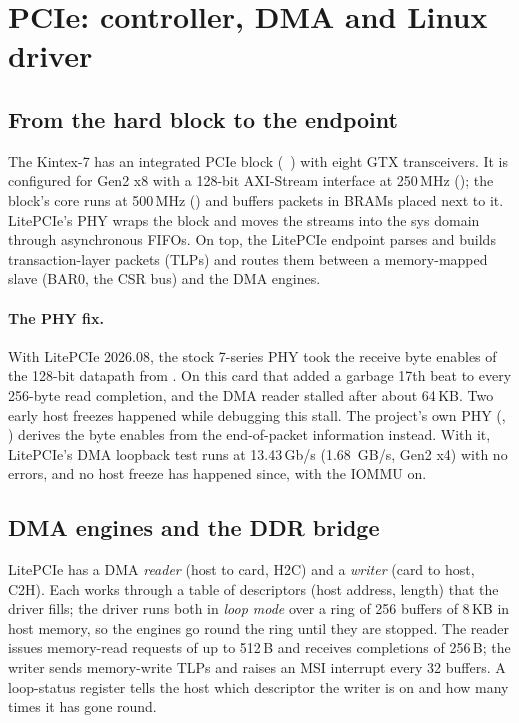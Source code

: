 \section{PCIe: controller, DMA and Linux driver}
\label{sec:pcie}

\subsection{From the hard block to the endpoint}
The Kintex-7 has an integrated PCIe block (~\cite{ug477}) with eight GTX transceivers. It is
configured for Gen2 x8 with a 128-bit AXI-Stream interface at 250\,MHz (); the block's core runs at
500\,MHz () and buffers packets in BRAMs placed next to it. LitePCIe's PHY wraps the block and moves
the streams into the sys domain through asynchronous FIFOs. On top, the LitePCIe endpoint parses and builds
transaction-layer packets (TLPs) and routes them between a memory-mapped slave (BAR0, the CSR bus) and the DMA
engines.

\paragraph{The PHY fix.} With LitePCIe 2026.08, the stock 7-series PHY took the receive byte enables of the
128-bit datapath from . On this card that added a garbage 17th beat to every 256-byte read completion,
and the DMA reader stalled after about 64\,KB. Two early host freezes happened while debugging this stall. The
project's own PHY (, ) derives the byte enables from
the end-of-packet information instead. With it, LitePCIe's DMA loopback test runs at 13.43\,Gb/s
(\SI{1.68}{GB/s}, Gen2 x4) with no errors, and no host freeze has happened since, with the IOMMU on.

\subsection{DMA engines and the DDR bridge}
LitePCIe has a DMA \emph{reader} (host to card, H2C) and a \emph{writer} (card to host, C2H). Each works through a
table of descriptors (host address, length) that the driver fills; the driver runs both in \emph{loop mode} over a
ring of 256 buffers of 8\,KB in host memory, so the engines go round the ring until they are stopped. The reader
issues memory-read requests of up to 512\,B and receives completions of 256\,B; the writer sends memory-write TLPs and
raises an MSI interrupt every 32 buffers. A loop-status register tells the host which descriptor the writer is on and
how many times it has gone round.

